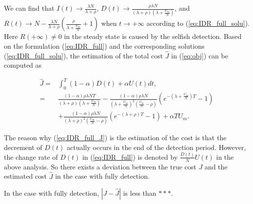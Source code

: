 We can find that $I(t) \rightarrow \frac{ \lambda N }{ \lambda + \rho }$,
$D(t) \rightarrow \frac{ \rho \lambda N }{ (\lambda + \rho)(\lambda + \frac{U_{m}}{N}) }$,
and $R(t) \rightarrow  N - \frac{ \lambda N }{ \lambda + \rho } \left( \frac{\rho}{\lambda + \frac{U_{m}}{N}} + 1 \right)$
when $t \rightarrow +\infty$ according to (\ref{eq:IDR_full_solu}).
Here $R(+\infty) \neq 0$ in the steady state is caused by the selfish detection.
Based on the formulation (\ref{eq:IDR_full}) and the corresponding solutions (\ref{eq:IDR_full_solu}),
the estimation of the total cost $\hat{J}$ in (\ref{eq:obj})
can be computed as
\begin{small}
\begin{equation}
\label{eq:IDR_full_J}
\begin{aligned}
\hat{J} =& \int_{0}^{T} (1-\alpha) D(t) + \alpha U(t) dt, \\
=& \frac{ (1-\alpha) \rho \lambda N T }{ (\lambda + \rho)(\lambda + \frac{U_{m}}{N}) }
- \frac{(1-\alpha) \rho \lambda N}{ {(\lambda + \frac{U_{m}}{N})}^{2} (\frac{U_{m}}{N} - \rho)}
(e^{-(\lambda + \frac{U_{m}}{N})T} - 1 ) \\
&+ \frac{(1-\alpha) \rho \lambda N }{ {(\lambda + \rho)}^{2} (\frac{U_{m}}{N} - \rho) }
(e^{-(\lambda + \rho)T} - 1 )
+ \alpha T U_{m}.
\end{aligned}
\end{equation}
\end{small}
The reason why (\ref{eq:IDR_full_J}) is the estimation of the cost
is that
the decrement of $D(t)$ actually occurs in the end of the detection period.
However, the change rate of $D(t)$ in (\ref{eq:IDR_full})
is denoted by $\frac{D(t)}{N}U(t)$ in the above analysis.
So there exists a deviation between the true cost $J$ and the estimated cost $\hat{J}$
in the case with fully detection.
\begin{lem}
In the case with fully detection,
$|J - \hat{J}|$ is less than $***$.
\end{lem}

